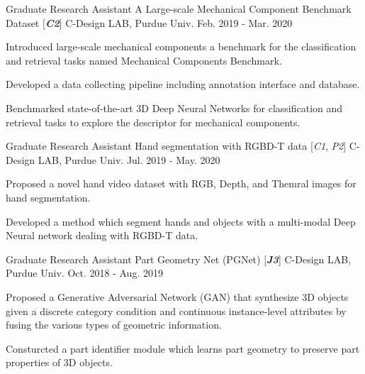 \begin{cventries}
\cventry
{Graduate Research Assistant} %
{A Large-scale Mechanical Component Benchmark Dataset [\textit{\textbf{C2}}]} %
{C-Design LAB, Purdue Univ.} %
{Feb. 2019 - Mar. 2020} %
{ %
\begin{cvitems}
\item {Introduced large-scale mechanical components a benchmark for the classification and retrieval tasks named Mechanical Components Benchmark.}
\item {Developed a data collecting pipeline including annotation interface and database.}
\item {Benchmarked state-of-the-art 3D Deep Neural Networks for classification and retrieval tasks to explore the descriptor for mechanical components.}
\end{cvitems}
}

\cventry
{Graduate Research Assistant} %
{Hand segmentation with RGBD-T data [\textit{\textit{C1}}, \textit{\textit{P2}}]} %
{C-Design LAB, Purdue Univ.} %
{Jul. 2019 - May. 2020} %
{ %
\begin{cvitems}
\item {Proposed a novel hand video dataset with RGB, Depth, and Themral images for hand segmentation.}
\item {Developed a method which segment hands and objects with a multi-modal Deep Neural network dealing with RGBD-T data.}
\end{cvitems}
}


\cventry
{Graduate Research Assistant} %
{Part Geometry Net (PGNet) [\textit{\textbf{J3}}]} %
{C-Design LAB, Purdue Univ.} %
{Oct. 2018 - Aug. 2019} %
{ %
\begin{cvitems}
\item {Proposed a Generative Adversarial Network (GAN) that synthesize 3D objects given a discrete category condition and continuous instance-level attributes by fusing the various types of geometric information.}
\item {Consturcted a part identifier module which learns part geometry to preserve part properties of 3D objects.}
\end{cvitems}
}



\end{cventries}
